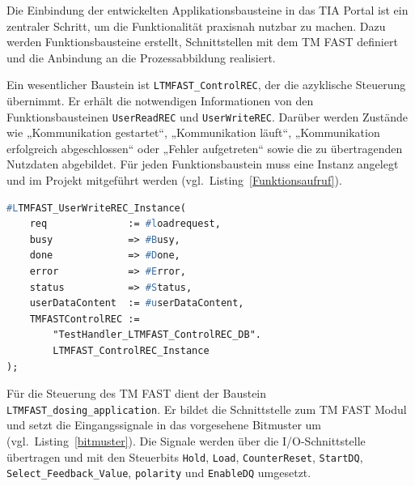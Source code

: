 Die Einbindung der entwickelten Applikationsbausteine in das TIA Portal ist ein zentraler Schritt, um die Funktionalität praxisnah nutzbar zu machen.  
Dazu werden Funktionsbausteine erstellt, Schnittstellen mit dem TM FAST definiert und die Anbindung an die Prozessabbildung realisiert.

Ein wesentlicher Baustein ist \texttt{LTMFAST\_ControlREC}, der die azyklische Steuerung übernimmt. Er erhält die notwendigen Informationen von den Funktionsbausteinen \texttt{UserReadREC} und \texttt{UserWriteREC}. Darüber werden Zustände wie „Kommunikation gestartet“, „Kommunikation läuft“, „Kommunikation erfolgreich abgeschlossen“ oder „Fehler aufgetreten“ sowie die zu übertragenden Nutzdaten abgebildet.  
Für jeden Funktionsbaustein muss eine Instanz angelegt und im Projekt mitgeführt werden (vgl.~Listing~\ref{Funktionsaufruf}).

\begin{lstlisting}[language=Pascal, label={Funktionsaufruf},captionpos=b,caption={Funktionsaufruf von \#LTMFAST\_UserWriteREC\_Instance}]
#LTMFAST_UserWriteREC_Instance(
    req              := #loadrequest,
    busy             => #Busy,
    done             => #Done,
    error            => #Error,
    status           => #Status,
    userDataContent  := #userDataContent,
    TMFASTControlREC := 
        "TestHandler_LTMFAST_ControlREC_DB".
        LTMFAST_ControlREC_Instance
);
\end{lstlisting}

Für die Steuerung des TM FAST dient der Baustein \texttt{LTMFAST\_dosing\_application}.  
Er bildet die Schnittstelle zum TM FAST Modul und setzt die Eingangssignale in das vorgesehene Bitmuster um (vgl.~Listing~\ref{bitmuster}).  
Die Signale werden über die I/O-Schnittstelle übertragen und mit den Steuerbits \texttt{Hold}, \texttt{Load}, \texttt{CounterReset}, \texttt{StartDQ}, \texttt{Select\_Feedback\_Value}, \texttt{polarity} und \texttt{EnableDQ} umgesetzt.

